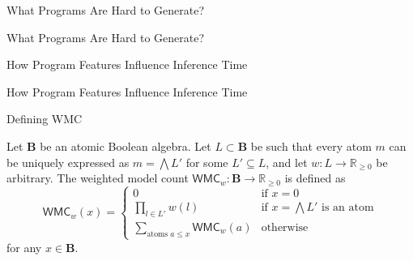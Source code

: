 \documentclass{beamer}
\begin{document}
\begin{frame}{What Programs Are Hard to Generate?}
  \begin{figure}
    \centering
    
  \end{figure}
\end{frame}

\begin{frame}{What Programs Are Hard to Generate?}
  \begin{figure}
    \centering
    \resizebox{\linewidth}{!}{}
  \end{figure}
\end{frame}

\begin{frame}{How Program Features Influence Inference Time}
  \begin{figure}
    \centering
    \resizebox{\linewidth}{!}{}
  \end{figure}
\end{frame}

\begin{frame}{How Program Features Influence Inference Time}
  \begin{figure}
    \centering
    
  \end{figure}
\end{frame}

\begin{frame}{Defining WMC}
  \begin{definition}
    Let $\mathbf{B}$ be an atomic Boolean algebra. Let $L \subset \mathbf{B}$ be
    such that every atom $m$ can be uniquely expressed as $m = \bigwedge L'$ for
    some $L' \subseteq L$, and let $w\colon L \to \mathbb{R}_{\ge 0}$ be
    arbitrary. The \alert{weighted model count} $\mathsf{WMC}_w\colon \mathbf{B}
    \to \mathbb{R}_{\ge 0}$ is defined as
    \[
      \mathsf{WMC}_w(x) = \begin{cases}
        0 & \text{if } x = 0 \\
        \prod_{l \in L'} w(l) & \text{if } x = \bigwedge L' \text{ is an atom}
        \\
        \sum_{\text{atoms } a \le x} \mathsf{WMC}_w(a) & \text{otherwise}
      \end{cases}
    \]
    for any $x \in \mathbf{B}$.
  \end{definition}
\end{frame}
\end{document}
